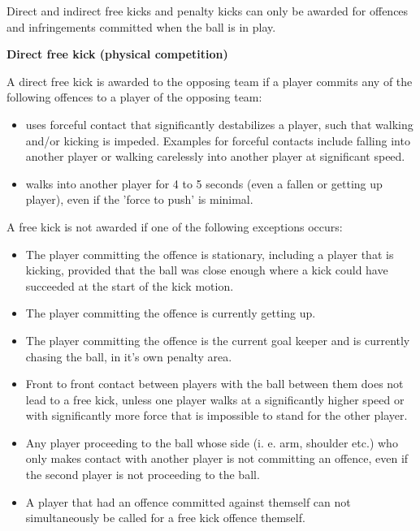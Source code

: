 \clearpage
\sffamily
{\bfseries\color[rgb]{0.4,0.4,0.4}{Law 12 -- Fouls and Misconduct} }
{}

\bigskip

Direct and indirect free kicks and penalty kicks can only be awarded for
offences and infringements committed when the ball is in play.

\bigskip

{\bfseries Direct free kick (physical competition)}

\headlinebox

A direct free kick is awarded to the opposing team if a player commits
any of the following offences to a player of the opposing team:
\begin{itemize}
\item uses forceful contact that significantly destabilizes a player, such
    that walking and/or kicking is impeded. Examples for forceful contacts
    include falling into another player or walking carelessly into another
    player at significant speed.
\item walks into another player for 4 to 5 seconds (even a fallen or
    getting up player), even if the 'force to push' is minimal.
\end{itemize}


A free kick is not awarded if one of the following exceptions occurs: 
\begin{itemize}
\item The player committing the offence is stationary, including a player that is kicking, provided that the ball was close enough where a kick could have succeeded at the start of the kick motion.
\item The player committing the offence is currently getting up.
\item The player committing the offence is the current goal keeper and is currently chasing the ball, in it's own penalty area.
\item Front to front contact between players with the ball between them does not lead to a free kick, unless one player walks at a significantly higher speed or with significantly more force that is impossible to stand for the other player.
\item Any player proceeding to the ball whose side (i. e. arm, shoulder etc.) who only  makes contact with another player is not committing an offence, even if the second player is not proceeding to the ball.
\item A player that had an offence committed against themself can not simultaneously be called for a free kick offence themself.
\end{itemize}


